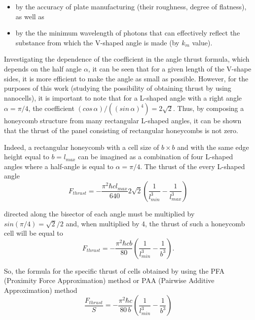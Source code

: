 \documentclass[twoside, 10pt]{article}
\begin{document}
\begin{multicols}{2}
\begin{itemize}
\item
  by the accuracy of plate manufacturing (their roughness,
  degree of flatness), as well as
\item
  by the the minimum wavelength of photons that can effectively reflect
  the substance from which the \mbox{V-shaped} angle is made (by \(k_m\) value).
\end{itemize}

    Investigating the dependence of the coefficient in the angle thrust
formula, which depends on the half angle \(\alpha\), it can be
seen that for a given length of the  \mbox{V-shape} sides, it is more efficient
to make the angle as small as possible. However, for the purposes of
this work (studying the possibility of obtaining thrust by using
nanocells), it is important to note that for a \mbox{L-shaped} angle with a right angle
\(\alpha = {\pi}/{4}\), the coefficient
\(\left({cos\, \alpha}\right)\big/\left({\left(sin\, \alpha\right)^4}\right) = 2\sqrt{2}\).
Thus, by composing a honeycomb structure from many
rectangular \mbox{L-shaped} angles, it can be shown that the thrust of the panel consisting
of rectangular honeycombs is not zero.

Indeed, a rectangular honeycomb with a cell size of \(b \times b\) and
with the same edge height equal to \(b = l_{max}\) can be imagined as a
combination of four \mbox{L-shaped} angles where a half-angle is equal to
\(\alpha = {\pi}/{4}\). The thrust of the every \mbox{L-shaped} angle
\noindent
\begin{equation}F_{thrust} = - \frac{\pi^2\hbar c l_{max}}{640} 2\sqrt{2} \left(\frac{1}{l_{min}^3} - \frac{1}{l_{max}^3}\right)\end{equation}

directed along the bisector of each angle must be multiplied by
\(sin\left({\pi}/{4}\right)={\sqrt{2}}\big/{2}\) and, when multiplied by
4, the thrust of such a honeycomb cell will be equal to
\noindent
\begin{equation}F_{thrust} = - \frac{\pi^2\hbar c b}{80} \left(\frac{1}{l_{min}^3} - \frac{1}{b^3}\right).\end{equation}

So, the formula for the specific thrust of cells obtained by using the PFA
(Proximity Force Approximation) method or PAA (Pairwise Additive
Approximation) method
\noindent
\begin{equation}\frac{F_{thrust}}{S} = - \frac{\pi^2\hbar c}{80\, b} \left(\frac{1}{l_{min}^3} - \frac{1}{b^3}\right)\end{equation}


\end{multicols}
\end{document}
